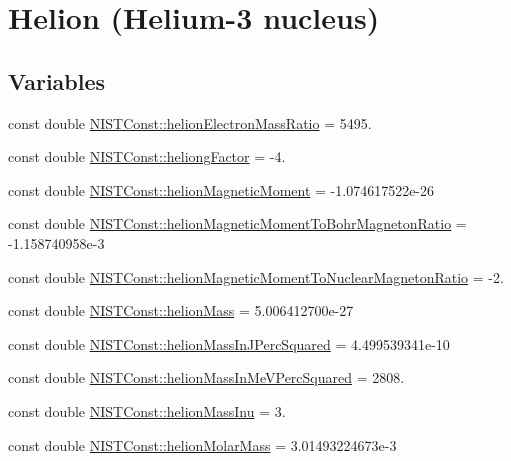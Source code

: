 \hypertarget{group___n_i_s_t_const-_helion}{}\section{Helion (Helium-\/3 nucleus)}
\label{group___n_i_s_t_const-_helion}
\subsection*{Variables}
\begin{DoxyCompactItemize}
\item 
const double \hyperlink{group___n_i_s_t_const-_helion_ga5c779784a4f223f0936cb067e2674474}{N\+I\+S\+T\+Const\+::helion\+Electron\+Mass\+Ratio} = 5495.
\item 
const double \hyperlink{group___n_i_s_t_const-_helion_ga93c08fee128607b2609355ea6ddbc76e}{N\+I\+S\+T\+Const\+::heliong\+Factor} = -\/4.
\item 
const double \hyperlink{group___n_i_s_t_const-_helion_ga06d8cffa7452ce8d1d30334e89fddc55}{N\+I\+S\+T\+Const\+::helion\+Magnetic\+Moment} = -\/1.\+074617522e-\/26
\item 
const double \hyperlink{group___n_i_s_t_const-_helion_gab2ead007452b8d42528f8d03d988d149}{N\+I\+S\+T\+Const\+::helion\+Magnetic\+Moment\+To\+Bohr\+Magneton\+Ratio} = -\/1.\+158740958e-\/3
\item 
const double \hyperlink{group___n_i_s_t_const-_helion_ga4abc0d1191b0610736c6f70a56c24562}{N\+I\+S\+T\+Const\+::helion\+Magnetic\+Moment\+To\+Nuclear\+Magneton\+Ratio} = -\/2.
\item 
const double \hyperlink{group___n_i_s_t_const-_helion_gac36ce0665418a2b628ca7c28c8887d2b}{N\+I\+S\+T\+Const\+::helion\+Mass} = 5.\+006412700e-\/27
\item 
const double \hyperlink{group___n_i_s_t_const-_helion_ga51d52d347de11b15efccd0613db9abe3}{N\+I\+S\+T\+Const\+::helion\+Mass\+In\+J\+Perc\+Squared} = 4.\+499539341e-\/10
\item 
const double \hyperlink{group___n_i_s_t_const-_helion_gaa7af65f7f94682dba2c3b50a24dafe02}{N\+I\+S\+T\+Const\+::helion\+Mass\+In\+Me\+V\+Perc\+Squared} = 2808.
\item 
const double \hyperlink{group___n_i_s_t_const-_helion_ga764735e9b705bc9493bd45acb466a7e9}{N\+I\+S\+T\+Const\+::helion\+Mass\+Inu} = 3.
\item 
const double \hyperlink{group___n_i_s_t_const-_helion_gac7da5201f92f47f4ca2310ae1c9f4fb6}{N\+I\+S\+T\+Const\+::helion\+Molar\+Mass} = 3.\+01493224673e-\/3

\end{DoxyCompactItemize}

